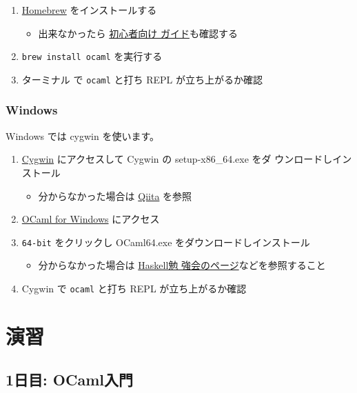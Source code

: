 \documentclass[a4paper,11pt]{jsarticle}
\begin{document}
\begin{enumerate}
\item \href{https://brew.sh/ja}{Homebrew} をインストールする
  \begin{itemize}
  \item 出来なかったら \href{https://zenn.dev/inablog/articles/5e790c9fbdad20}{初心者向け
      ガイド}も確認する
  \end{itemize}
\item \verb|brew install ocaml| を実行する
\item ターミナル で \verb|ocaml| と打ち REPL が立ち上がるか確認
\end{enumerate}

\subsubsection{Windows}

Windows では cygwin を使います。

\begin{enumerate}

\item \href{https://cygwin.com/}{Cygwin} にアクセスして Cygwin の setup-x86\_64.exe をダ
  ウンロードしインストール
  \begin{itemize}
  \item 分からなかった場合は
    \href{https://qiita.com/nouernet/items/271a285db517e4a25817}{Qiita} を参照
  \end{itemize}
\item \href{https://fdopen.github.io/opam-repository-mingw/installation/}{OCaml for
    Windows} にアクセス
\item \verb|64-bit| をクリックし OCaml64.exe をダウンロードしインストール
  \begin{itemize}
  \item 分からなかった場合は
    \href{https://haskell.hatenablog.com/entry/How-to-install-OCaml-on-Windows}{Haskell勉
      強会のページ}などを参照すること
  \end{itemize}
\item Cygwin で \verb|ocaml| と打ち REPL が立ち上がるか確認
\end{enumerate}

\section{演習}

\subsection{1日目: OCaml入門}
\end{document}
